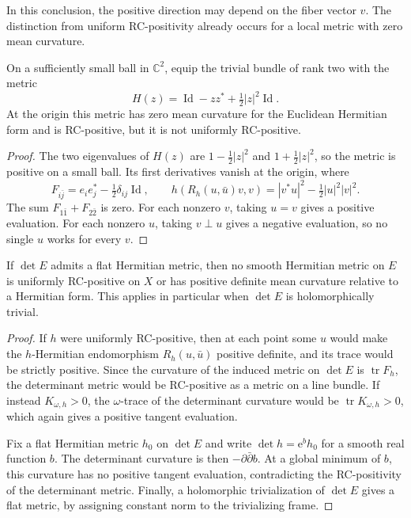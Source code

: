 In this conclusion, the positive direction may depend on the fiber vector $v$. The distinction from uniform RC-positivity already occurs for a local metric with zero mean curvature.

\begin{example}\label{ex:local-rc-nonuniform}
On a sufficiently small ball in $\mathbb C^2$, equip the trivial bundle of rank two with the metric
\[
 H(z)=\operatorname{Id}-zz^*+\tfrac12|z|^2\operatorname{Id}.
\]
At the origin this metric has zero mean curvature for the Euclidean Hermitian form and is RC-positive, but it is not uniformly RC-positive.
\end{example}
\begin{proof}
The two eigenvalues of $H(z)$ are $1-\tfrac12|z|^2$ and $1+\tfrac12|z|^2$, so the metric is positive on a small ball. Its first derivatives vanish at the origin, where
\[
 F_{i\bar j}=e_ie_j^*-\tfrac12\delta_{ij}\operatorname{Id},\qquad
 h(R_h(u,\bar u)v,v)=|v^*u|^2-\tfrac12|u|^2|v|^2.
\]
The sum $F_{1\bar1}+F_{2\bar2}$ is zero. For each nonzero $v$, taking $u=v$ gives a positive evaluation. For each nonzero $u$, taking $v\perp u$ gives a negative evaluation, so no single $u$ works for every $v$.
\end{proof}

\begin{proposition}\label{prop:trivial-determinant-rc-obstruction}
If $\det E$ admits a flat Hermitian metric, then no smooth Hermitian metric on $E$ is uniformly RC-positive on $X$ or has positive definite mean curvature relative to a Hermitian form. This applies in particular when $\det E$ is holomorphically trivial.
\end{proposition}
\begin{proof}
If $h$ were uniformly RC-positive, then at each point some $u$ would make the $h$-Hermitian endomorphism $R_h(u,\bar u)$ positive definite, and its trace would be strictly positive. Since the curvature of the induced metric on $\det E$ is $\operatorname{tr}F_h$, the determinant metric would be RC-positive as a metric on a line bundle. If instead $K_{\omega,h}>0$, the $\omega$-trace of the determinant curvature would be $\operatorname{tr}K_{\omega,h}>0$, which again gives a positive tangent evaluation.

Fix a flat Hermitian metric $h_0$ on $\det E$ and write $\det h=\mathrm e^b h_0$ for a smooth real function $b$. The determinant curvature is then $-\partial\bar\partial b$. At a global minimum of $b$, this curvature has no positive tangent evaluation, contradicting the RC-positivity of the determinant metric. Finally, a holomorphic trivialization of $\det E$ gives a flat metric, by assigning constant norm to the trivializing frame.
\end{proof}

